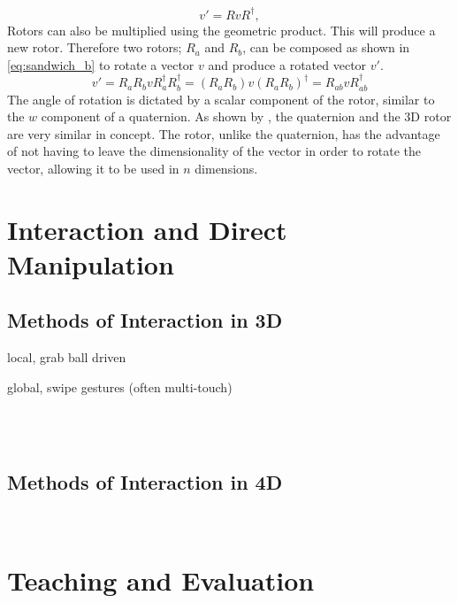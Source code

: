 \documentclass{l4proj}
\begin{document}
%
\begin{equation}
  \label{eq:sandwich_a}
    v' = R v R^\dagger,
\end{equation}
%
Rotors can also be multiplied using the geometric product. This will produce a new rotor. Therefore two rotors; $R_a$ and $R_b$, can be composed as shown in \cref{eq:sandwich_b} to rotate a vector \(v\) and produce a rotated vector \(v'\).
%
\begin{equation}
  \label{eq:sandwich_b}
  v' = R_a R_b v R_a^{\dagger} R_b^{\dagger}
   = (R_a R_b) v (R_a R_b)^{\dagger}
   = R_{ab}^{} v R_{ab}^{\dagger}
\end{equation}
%
The angle of rotation is dictated by a scalar component of the rotor, similar to the \(w\) component of a quaternion. 
As shown by \citep{bosch_code_nodate}, the quaternion and the 3D rotor are very similar in concept. The rotor, unlike the quaternion, has the advantage of not having to leave the dimensionality of the vector in order to rotate the vector, allowing it to be used in \(n\) dimensions.

\section{Interaction and Direct Manipulation}

\subsection{Methods of Interaction in 3D}

local, grab ball driven

global, swipe gestures (often multi-touch)

\citep{shoemake_arcball_1994}\\
\citep{hinckley_usability_1997}\\
\citep{balakrishnan_rockinmouse_1997}

\subsection{Methods of Interaction in 4D}

\citep{murata_interactive_2000}\\
\citep{kageyama_keyboard-based_2005}

\section{Teaching and Evaluation}
\label{teaching_and_eval}
\end{document}
